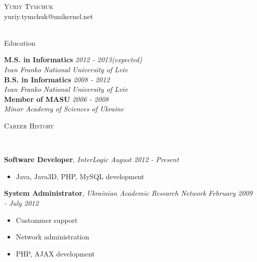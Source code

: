 \documentclass[9pt]{article}
\newenvironment{changemargin}[2]{%
  \begin{list}{}{%
    \setlength{\topsep}{0pt}%
    \setlength{\leftmargin}{#1}%
    \setlength{\rightmargin}{#2}%
    \setlength{\listparindent}{\parindent}%
    \setlength{\itemindent}{\parindent}%
    \setlength{\parsep}{\parskip}%
  }%
  \item[]}{\end{list}
}
\newcommand{\lineover}{
	\begin{changemargin}{-0.05in}{-0.05in}
		\vspace*{-8pt}
		\hrulefill \\
		\vspace*{-2pt}
	\end{changemargin}
}
\newcommand{\header}[1]{
	\begin{changemargin}{-0.5in}{-0.5in}
		\scshape{#1}\\
  	\lineover
	\end{changemargin}
}
\newcommand{\contact}[4]{
	\begin{changemargin}{-0.5in}{-0.5in}
		\begin{center}
			{\Large \scshape {#1}}\\ \smallskip
			{#2}\\ \smallskip 
			{#3}\\ \smallskip
			{#4}\smallskip
		\end{center}
	\end{changemargin}
}
\newenvironment{body} {
	\vspace*{-16pt}
	\begin{changemargin}{-0.25in}{-0.5in}
  }	
	{\end{changemargin}
}
\begin{document}
\contact{Yuriy Tymchuk}{yuriy.tymchuk@unikernel.net}{\hspace*{\fill}}



\header{Education}

\begin{body}
	\vspace{14pt}
	\textbf{M.S. in Informatics}{} \hfill \emph{2012 - 2013(expected)} \\
	\emph{Ivan Franko National University of Lviv} \\
  \medskip
	\textbf{B.S. in Informatics}{} \hfill \emph{2008 - 2012} \\
	\emph{Ivan Franko National University of Lviv} \\
  \medskip
	\textbf{Member of MASU}{} \hfill \emph{2006 - 2008} \\
	\emph{Minor Academy of Sciences of Ukraine} \\
\end{body}

\smallskip


\header{Career History}

\begin{body}
	\vspace{14pt}
	\textbf{Software Developer}, \emph{ InterLogic} \hfill \emph{August 2012 - Present}\\
	\vspace*{-4pt}
	\begin{itemize} \itemsep -0pt
		\item Java, Java3D, PHP, MySQL development
	\end{itemize}
	\textbf{System Administrator}, \emph{Ukrainian Academic Research Network} \hfill \emph{February 2009 - July 2012}\\
	\vspace*{-4pt}
	\begin{itemize} \itemsep -0pt
		\item Custommer support
		\item Network administration
		\item PHP, AJAX development
	\end{itemize}

\end{body}
\end{document}

